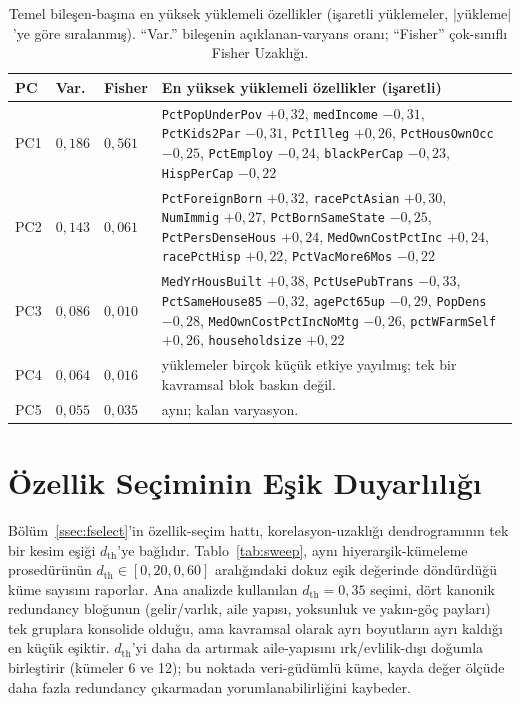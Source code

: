 \documentclass{ieeeaccess}
\begin{document}
\begin{table}[!t]
\caption{Temel bileşen-başına en yüksek yüklemeli özellikler (işaretli yüklemeler, $|\text{yükleme}|$'ye göre sıralanmış). ``Var.'' bileşenin açıklanan-varyans oranı; ``Fisher'' çok-sınıflı Fisher Uzaklığı.}
\label{tab:pcaload}
\centering
\footnotesize
\begin{tabular}{p{0.6cm}p{0.7cm}p{0.7cm}p{5.4cm}}
\toprule
PC & Var. & Fisher & En yüksek yüklemeli özellikler (işaretli) \\
\midrule
PC1 & $0{,}186$ & $0{,}561$ & \texttt{PctPopUnderPov} $+0{,}32$, \texttt{medIncome} $-0{,}31$, \texttt{PctKids2Par} $-0{,}31$, \texttt{PctIlleg} $+0{,}26$, \texttt{PctHousOwnOcc} $-0{,}25$, \texttt{PctEmploy} $-0{,}24$, \texttt{blackPerCap} $-0{,}23$, \texttt{HispPerCap} $-0{,}22$ \\
\addlinespace
PC2 & $0{,}143$ & $0{,}061$ & \texttt{PctForeignBorn} $+0{,}32$, \texttt{racePctAsian} $+0{,}30$, \texttt{NumImmig} $+0{,}27$, \texttt{PctBornSameState} $-0{,}25$, \texttt{PctPersDenseHous} $+0{,}24$, \texttt{MedOwnCostPctInc} $+0{,}24$, \texttt{racePctHisp} $+0{,}22$, \texttt{PctVacMore6Mos} $-0{,}22$ \\
\addlinespace
PC3 & $0{,}086$ & $0{,}010$ & \texttt{MedYrHousBuilt} $+0{,}38$, \texttt{PctUsePubTrans} $-0{,}33$, \texttt{PctSameHouse85} $-0{,}32$, \texttt{agePct65up} $-0{,}29$, \texttt{PopDens} $-0{,}28$, \texttt{MedOwnCostPctIncNoMtg} $-0{,}26$, \texttt{pctWFarmSelf} $+0{,}26$, \texttt{householdsize} $+0{,}22$ \\
\addlinespace
PC4 & $0{,}064$ & $0{,}016$ & yüklemeler birçok küçük etkiye yayılmış; tek bir kavramsal blok baskın değil. \\
\addlinespace
PC5 & $0{,}055$ & $0{,}035$ & aynı; kalan varyasyon. \\
\bottomrule
\end{tabular}
\end{table}

\section{Özellik Seçiminin Eşik Duyarlılığı}
\label{app:sweep}
Bölüm~\ref{ssec:fselect}'in özellik-seçim hattı, korelasyon-uzaklığı dendrogramının tek bir kesim eşiği $d_{\mathrm{th}}$'ye bağlıdır. Tablo~\ref{tab:sweep}, aynı hiyerarşik-kümeleme prosedürünün $d_{\mathrm{th}}\in[0{,}20, 0{,}60]$ aralığındaki dokuz eşik değerinde döndürdüğü küme sayısını raporlar. Ana analizde kullanılan $d_{\mathrm{th}}=0{,}35$ seçimi, dört kanonik redundancy bloğunun (gelir/varlık, aile yapısı, yoksunluk ve yakın-göç payları) tek gruplara konsolide olduğu, ama kavramsal olarak ayrı boyutların ayrı kaldığı en küçük eşiktir. $d_{\mathrm{th}}$'yi daha da artırmak aile-yapısını ırk/evlilik-dışı doğumla birleştirir (kümeler 6 ve 12); bu noktada veri-güdümlü küme, kayda değer ölçüde daha fazla redundancy çıkarmadan yorumlanabilirliğini kaybeder.
\end{document}
